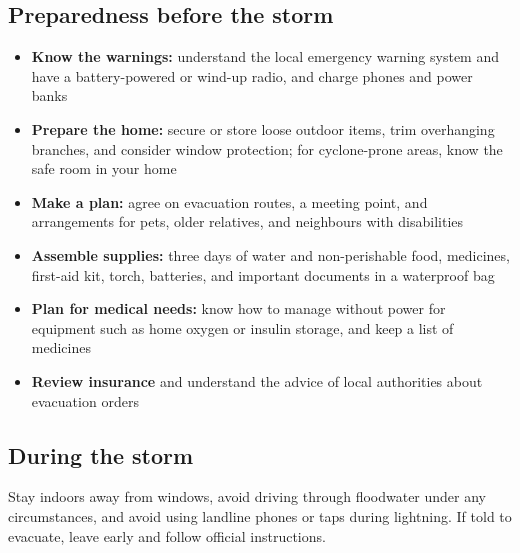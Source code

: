 \subsection*{Preparedness before the storm}
\begin{itemize}
    \item \textbf{Know the warnings:} understand the local emergency warning system and have a battery-powered or wind-up radio, and charge phones and power banks
    \item \textbf{Prepare the home:} secure or store loose outdoor items, trim overhanging branches, and consider window protection; for cyclone-prone areas, know the safe room in your home
    \item \textbf{Make a plan:} agree on evacuation routes, a meeting point, and arrangements for pets, older relatives, and neighbours with disabilities
    \item \textbf{Assemble supplies:} three days of water and non-perishable food, medicines, first-aid kit, torch, batteries, and important documents in a waterproof bag
    \item \textbf{Plan for medical needs:} know how to manage without power for equipment such as home oxygen or insulin storage, and keep a list of medicines
    \item \textbf{Review insurance} and understand the advice of local authorities about evacuation orders
\end{itemize}

\subsection*{During the storm}
Stay indoors away from windows, avoid driving through floodwater under any circumstances, and avoid using landline phones or taps during lightning. If told to evacuate, leave early and follow official instructions.

